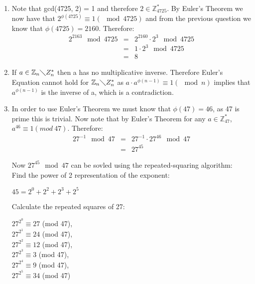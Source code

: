 \begin{enumerate}
    \item Note that gcd(4725, 2) = 1 and therefore $2 \in \mathbb{Z}^{*}_{4725}$. By Euler's Theorem we now 
    have that $2^{\phi(4725)} \equiv 1 (\mod 4725)$ and from the previous question we know that $\phi(4725) = 2160$.
    Therefore:
    \begin{eqnarray*}
        2^{2163} \mod 4725 &=& 2^{2160} \cdot 2^{3} \mod 4725 \\
        &=& 1 \cdot 2^{3} \mod 4725 \\
        &=& 8
    \end{eqnarray*}

    \item If $a \in \mathbb{Z}_{n}\mathbb\diagdown{Z}^{*}_{n}$ then a has no multiplicative 
    inverse. Therefore Euler's Equation cannot hold for $\mathbb{Z}_{n}\mathbb\diagdown{Z}^{*}_{n}$ 
    as $a \cdot a^{\phi(n-1)} \equiv 1 (\mod n)$ implies that $a^{\phi(n-1)}$ is the inverse of a, 
    which is a contradiction.

    \item In order to use Euler's Theorem we must know that $\phi(47) = 46$, as 
    47 is prime this is trivial. Now note that by Euler's Theorem for any $a \in
     \mathbb{Z}^{*}_{47}$,\\ $a^{46} \equiv 1 (mod\ 47)$. Therefore:
    \begin{eqnarray*}
        27^{-1} \mod 47 &=& 27^{-1} \cdot 27^{46} \mod 47 \\
        &=& 27^{45}
    \end{eqnarray*}

    Now $27^{45} \mod 47$ can be sovled using the repeated-squaring algorithm: \\
    Find the power of 2 representation of the exponent:
    \begin{center}
        $45 = 2^{0} + 2^{2} + 2^{3} + 2^{5}$
    \end{center}

    Calculate the repeated squares of 27:
    \begin{center}
        $27^{2^{0}} \equiv 27$ (mod 47), \\
        $27^{2^{1}} \equiv 24$ (mod 47), \\
        $27^{2^{2}} \equiv 12$ (mod 47), \\
        $27^{2^{3}} \equiv 3$ (mod 47), \\
        $27^{2^{4}} \equiv 9$ (mod 47), \\
        $27^{2^{5}} \equiv 34$ (mod 47)
    \end{center}


\end{enumerate}
